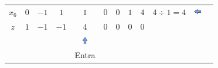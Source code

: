 \begin{frame}
{\begin{table}
\begin{tabular}{c c c c c c c c c c c c}
				\cellcolor{blue!80} \color{red} $ \scriptstyle x_6$
				& \cellcolor{yellow!60}  $ \scriptstyle 0$
				& \cellcolor{yellow!60}  $ \scriptstyle -1$ 
				& \cellcolor{yellow!60}  $ \scriptstyle 1$
				& \cellcolor{gray!60}  $ \scriptstyle 1$
				& \cellcolor{yellow!60}  $ \scriptstyle 0$
				& \cellcolor{yellow!60}  $ \scriptstyle 0$
				& \cellcolor{yellow!60}  $ \scriptstyle 1$ 
				& \cellcolor{gray!60}  $ \scriptstyle 4$ 
				& $ \scriptstyle 4 \div 1 = 4 $& \includegraphics[width=0.3cm,height=0.3cm]{setaesquerda.jpg} & \\
				\cellcolor{blue!80} \color{white} $ \scriptstyle z$
				& \cellcolor{yellow!60}  $ \scriptstyle 1$
				& \cellcolor{yellow!60}  $ \scriptstyle -1$ 
				& \cellcolor{yellow!60}  $ \scriptstyle -1$
				& \cellcolor{gray!60}  $ \scriptstyle 4$
				& \cellcolor{yellow!60}  $ \scriptstyle 0$
				& \cellcolor{yellow!60}  $ \scriptstyle 0$
				& \cellcolor{yellow!60}  $ \scriptstyle 0$ 
				& \cellcolor{gray!60}  $ \scriptstyle 0$ 
				& & & \\
				
				& 
				&  
				& 
				& \includegraphics[width=0.3cm,height=0.3cm]{setacima.jpg}
				& 
				& 
				&  
				&  
				& & & \\
				
				& 
				&  
				& 
				& \scriptsize Entra 
				& 
				& 
				&  
				&  
				& & & \\
				

\end{tabular}
\end{table}}
\end{frame}
